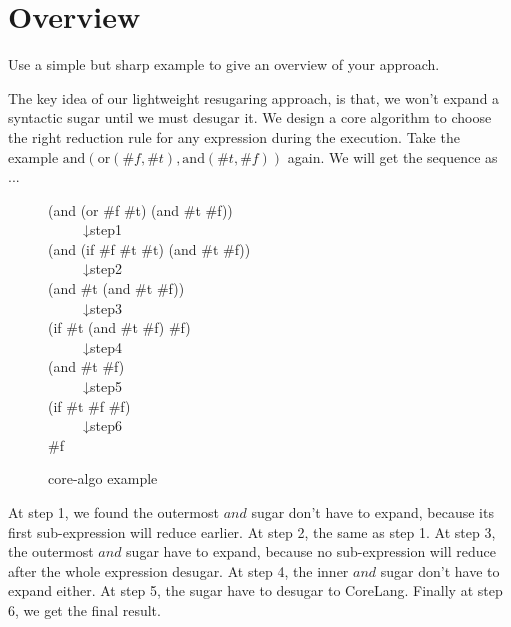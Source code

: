 \section{Overview}
\label{sec2}

Use a simple but sharp example to give an overview of your approach.

The key idea of our lightweight resugaring approach, is that, we won't expand a syntactic sugar until we must desugar it. We design a core algorithm to choose the right reduction rule for any expression during the execution. Take the example $\mbox{and}(\mbox{or}(\#f, \#t), \mbox{and}(\#t, \#f))$ again. We will get the sequence as ...

\begin{figure}[ht]
\parbox[t]{\textwidth}{
			\begin{center}  
				(and (or \#f \#t) (and \#t \#f))\\
				~~~~~↓step1\\
				(and (if \#f \#t \#t) (and \#t \#f))\\
				~~~~~↓step2\\
				(and \#t (and \#t \#f))\\
				~~~~~↓step3\\
				(if \#t (and \#t \#f) \#f)\\
				~~~~~↓step4\\
				(and \#t \#f)\\
				~~~~~↓step5\\
				(if \#t \#f \#f)\\
				~~~~~↓step6\\
				\#f
			\end{center}  
		}
\caption{core-algo example}
\label{fig:core-algo}
\end{figure}

At step 1, we found the outermost $and$ sugar don't have to expand, because its first sub-expression will reduce earlier. At step 2, the same as step 1. At step 3, the outermost $and$ sugar have to expand, because no sub-expression will reduce after the whole expression desugar. At step 4, the inner $and$ sugar don't have to expand either. At step 5, the sugar have to desugar to CoreLang. Finally at step 6, we get the final result.



